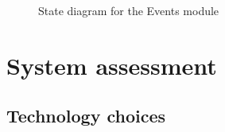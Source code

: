 \documentclass{article}
\begin{document}
			\begin{figure}[H]
				
				\caption{State diagram for the Events module}
				
			\end{figure}
	
	\pagebreak
	
	\section{System assessment}	
	
		\subsection{Technology choices}
\end{document}
